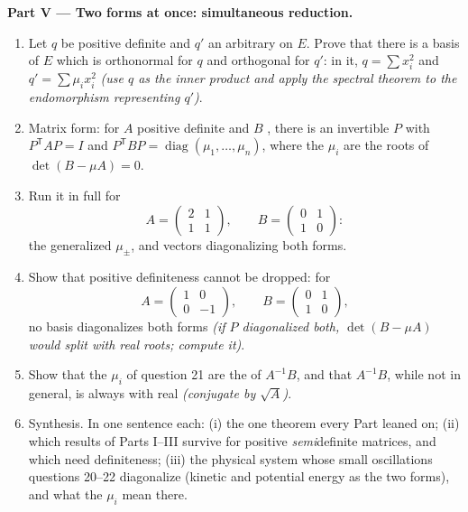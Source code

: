 \begin{problem}
\medskip
\noindent\textbf{Part V --- Two forms at once: simultaneous
reduction.}
\begin{enumerate}[resume]
  \item Let $q$ be positive definite and $q'$ an arbitrary
         on $E$. Prove that there is a basis of
        $E$ which is orthonormal for $q$ and orthogonal for
        $q'$: in it, $q = \sum x_i^2$ and $q' = \sum \mu_i
        x_i^2$ \emph{(use $q$ as the inner product and apply
        the spectral theorem to the endomorphism representing
        $q'$)}.
  \item Matrix form: for $A$ positive definite and $B$
        , there is an invertible $P$ with
        $P^{\mathsf T}AP = I$ and $P^{\mathsf T}BP =
        \operatorname{diag}(\mu_1, \dots, \mu_n)$, where the
        $\mu_i$ are the roots of $\det(B - \mu A) = 0$.
  \item Run it in full for
        \[
        A = \begin{pmatrix} 2 & 1\\ 1 & 1 \end{pmatrix},
        \qquad
        B = \begin{pmatrix} 0 & 1\\ 1 & 0 \end{pmatrix} :
        \]
        the generalized  $\mu_\pm$, and vectors
        diagonalizing both forms.
  \item Show that positive definiteness cannot be dropped: for
        \[
        A = \begin{pmatrix} 1 & 0\\ 0 & -1 \end{pmatrix},
        \qquad
        B = \begin{pmatrix} 0 & 1\\ 1 & 0 \end{pmatrix},
        \]
        no basis diagonalizes both forms \emph{(if $P$
        diagonalized both, $\det(B - \mu A)$ would split with
        real roots; compute it)}.
  \item Show that the $\mu_i$ of question 21 are the
         of $A^{-1}B$, and that $A^{-1}B$, while not
         in general, is always  with
        real  \emph{(conjugate by $\sqrt A$)}.
  \item Synthesis. In one sentence each: (i) the one theorem
        every Part leaned on; (ii) which results of Parts
        I--III survive for positive \emph{semi}definite
        matrices, and which need definiteness; (iii) the
        physical system whose small oscillations questions
        20--22 diagonalize (kinetic and potential energy as
        the two forms), and what the $\mu_i$ mean there.
\end{enumerate}
\end{problem}
